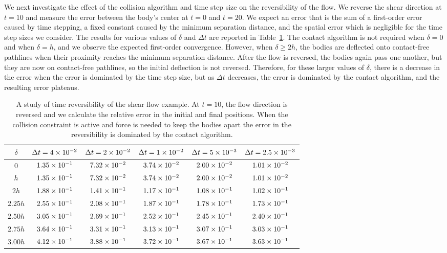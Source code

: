 \documentclass[AMA,STIX1COL]{WileyNJD-v2}
\begin{document}
We next investigate the effect of the collision algorithm and time step
size on the reversibility of the flow. We reverse the shear direction at
$t=10$ and measure the error between the body's center at $t=0$ and
$t=20$.  We expect an error that is the sum of a first-order error
caused by time stepping, a fixed constant caused by the minimum
separation distance, and the spatial error which is negligible for the
time step sizes we consider.  The results for various values of $\delta$
and $\Delta t$ are reported in Table~\ref{tab:reverse}. The contact
algorithm is not required when $\delta=0$ and when $\delta=h$, and we
observe the expected first-order convergence.  However, when $\delta
\geq 2h$, the bodies are deflected onto contact-free pathlines when
their proximity reaches the minimum separation distance.  After the flow
is reversed, the bodies again pass one another, but they are now on
contact-free pathlines, so the initial deflection is not reversed.
Therefore, for these larger values of $\delta$, there is a decrease in
the error when the error is dominated by the time step size, but as
$\Delta t$ decreases, the error is dominated by the contact algorithm,
and the resulting error plateaus.

\begin{table}[t]
\caption{A study of time reversibility of the shear flow example. At
  $t=10$, the flow direction is reversed and we calculate the relative
  error in the initial and final positions. When the collision
  constraint is active and force is needed to keep the bodies apart the
  error in the reversibility is dominated by the contact
algorithm.\label{tab:reverse}}
  \centering
  \begin{tabular*}{500pt}{@{\extracolsep\fill}c| c c c c c@{\extracolsep\fill}}
    \toprule
    $\delta$ & $\Delta t = 4\times 10^{-2}$ &$\Delta t = 2\times 10^{-2}$ &$\Delta t =
    1\times 10^{-2}$ &$\Delta t = 5\times 10^{-3}$ &$\Delta t = 2.5\times 10^{-3}$\\
    \midrule
    0 & $1.35\times 10^{-1}$ & $7.32\times 10^{-2}$ & $3.74\times 10^{-2}$ & $2.00\times 10^{-2}$ & $1.01\times 10^{-2}$\\
    $h$ & $1.35\times 10^{-1}$ & $7.32\times 10^{-2}$ & $3.74\times 10^{-2}$ & $2.00\times 10^{-2}$ & $1.01\times 10^{-2}$\\
    $2h$ & $1.88\times 10^{-1}$ & $1.41\times 10^{-1}$ & $1.17\times 10^{-1}$ & $1.08\times 10^{-1}$ &
    $1.02\times 10^{-1}$\\
    $2.25h$ & $2.55\times 10^{-1}$ & $2.08\times 10^{-1}$ & $1.87\times 10^{-1}$ & $1.78\times 10^{-1}$ &
    $1.73\times 10^{-1}$\\
    $2.50h$ & $3.05\times 10^{-1}$ & $2.69\times 10^{-1}$ & $2.52\times 10^{-1}$ & $2.45\times 10^{-1}$ &
    $2.40\times 10^{-1}$\\
    $2.75h$ & $3.64\times 10^{-1}$ & $3.31\times 10^{-1}$ & $3.13\times 10^{-1}$ & $3.07\times 10^{-1}$ &
    $3.03\times 10^{-1}$\\
    $3.00h$ & $4.12\times 10^{-1}$ & $3.88\times 10^{-1}$ & $3.72\times 10^{-1}$ & $3.67\times 10^{-1}$ &
    $3.63\times 10^{-1}$ \\
    \bottomrule
  \end{tabular*}
\end{table}
\end{document}
